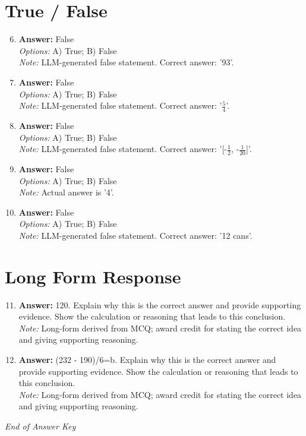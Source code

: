 \documentclass[12pt]{article}
\begin{document}
\section*{True / False}
\begin{enumerate}[label=\arabic*.]
\setcounter{enumi}{5}
\item \textbf{Answer:} False
\\ \textit{Options:} A) True; B) False
\\ \textit{Note:} LLM-generated false statement. Correct answer: '93'.
\item \textbf{Answer:} False
\\ \textit{Options:} A) True; B) False
\\ \textit{Note:} LLM-generated false statement. Correct answer: '\ensuremath{\frac{5}{4}}'.
\item \textbf{Answer:} False
\\ \textit{Options:} A) True; B) False
\\ \textit{Note:} LLM-generated false statement. Correct answer: '[-\ensuremath{\frac{1}{2}}, -\ensuremath{\frac{1}{20}}]'.
\item \textbf{Answer:} False
\\ \textit{Options:} A) True; B) False
\\ \textit{Note:} Actual answer is '4'.
\item \textbf{Answer:} False
\\ \textit{Options:} A) True; B) False
\\ \textit{Note:} LLM-generated false statement. Correct answer: '12 cans'.
\end{enumerate}

\section*{Long Form Response}
\begin{enumerate}[label=\arabic*.]
\setcounter{enumi}{10}
\item \textbf{Answer:} 120. Explain why this is the correct answer and provide supporting evidence. Show the calculation or reasoning that leads to this conclusion.
\\ \textit{Note:} Long-form derived from MCQ; award credit for stating the correct idea and giving supporting reasoning.
\item \textbf{Answer:} (232 - 190)/6=b. Explain why this is the correct answer and provide supporting evidence. Show the calculation or reasoning that leads to this conclusion.
\\ \textit{Note:} Long-form derived from MCQ; award credit for stating the correct idea and giving supporting reasoning.
\end{enumerate}

\vfill
\noindent\textit{End of Answer Key}
\end{document}
